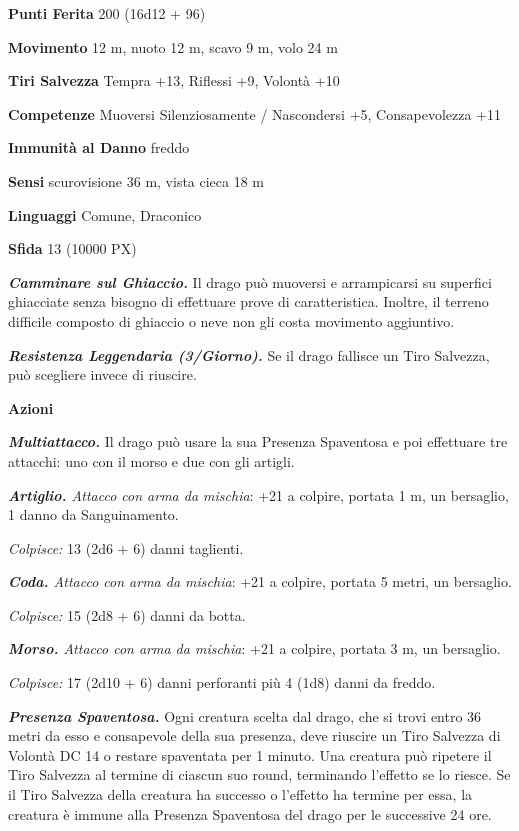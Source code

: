 \begin{multicols}{2}
\textbf{Punti Ferita} 200 (16d12 + 96)

\textbf{Movimento} 12 m, nuoto 12 m, scavo 9 m, volo 24 m

\textbf{Tiri Salvezza} Tempra +13, Riflessi +9, Volontà +10

\textbf{Competenze} Muoversi Silenziosamente / Nascondersi +5, Consapevolezza +11

\textbf{Immunità al Danno} freddo

\textbf{Sensi} scurovisione 36 m, vista cieca 18 m

\textbf{Linguaggi} Comune, Draconico

\textbf{Sfida} 13 (10000 PX)

\textit{\textbf{Camminare sul Ghiaccio.}} Il drago può muoversi e arrampicarsi su superfici ghiacciate senza bisogno di effettuare prove di caratteristica. Inoltre, il terreno difficile composto di ghiaccio o neve non gli costa movimento aggiuntivo.

\textit{\textbf{Resistenza Leggendaria (3/Giorno).}} Se il drago fallisce un Tiro Salvezza, può scegliere invece di riuscire.

\textbf{Azioni}

\textit{\textbf{Multiattacco.}} Il drago può usare la sua Presenza Spaventosa e poi effettuare tre attacchi: uno con il morso e due con gli artigli.

\textit{\textbf{Artiglio.} Attacco con arma da mischia}: +21 a colpire, portata 1 m, un bersaglio, 1 danno da Sanguinamento.

\textit{Colpisce:} 13 (2d6 + 6) danni taglienti.

\textit{\textbf{Coda.} Attacco con arma da mischia}: +21 a colpire, portata 5 metri, un bersaglio.

\textit{Colpisce:} 15 (2d8 + 6) danni da botta.

\textit{\textbf{Morso.} Attacco con arma da mischia}: +21 a colpire, portata 3 m, un bersaglio.

\textit{Colpisce:} 17 (2d10 + 6) danni perforanti più 4 (1d8) danni da freddo.

\textit{\textbf{Presenza Spaventosa.}} Ogni creatura scelta dal drago, che si trovi entro 36 metri da esso e consapevole della sua presenza, deve riuscire un Tiro Salvezza di Volontà DC 14 o restare spaventata per 1 minuto. Una creatura può ripetere il Tiro Salvezza al termine di ciascun suo round, terminando l'effetto se lo riesce. Se il Tiro Salvezza della creatura ha successo o l'effetto ha termine per essa, la creatura è immune alla Presenza Spaventosa del drago per le successive 24 ore.


\end{multicols}
